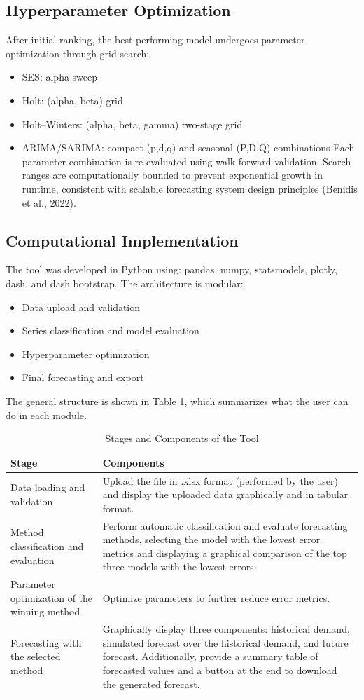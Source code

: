 \documentclass[journal,article,submit,pdftex,moreauthors]{Definitions/mdpi}
\begin{document}
\subsection {Hyperparameter Optimization}
After initial ranking, the best-performing model undergoes parameter optimization through grid search:
\begin{itemize}
\item SES: alpha sweep
\item Holt: (alpha, beta) grid
\item Holt–Winters: (alpha, beta, gamma) two-stage grid
\item ARIMA/SARIMA: compact (p,d,q) and seasonal (P,D,Q) combinations
Each parameter combination is re-evaluated using walk-forward validation.
Search ranges are computationally bounded to prevent exponential growth in runtime, consistent with scalable forecasting system design principles (Benidis et al., 2022).
\end{itemize}

\subsection {Computational Implementation}

The tool was developed in Python using: pandas, numpy, statsmodels, plotly, dash, and dash bootstrap.
The architecture is modular:
\begin{itemize}
\item Data upload and validation
\item Series classification and model evaluation
\item Hyperparameter optimization
\item Final forecasting and export
\end{itemize}

The general structure is shown in Table 1, which summarizes what the user can do in each module.
\begin{table}[H]
\caption{Stages and Components of the Tool}
\centering
\begin{tabularx}{\textwidth}{lX}
\toprule
\textbf{Stage} & \textbf{Components} \\
\midrule
Data loading and validation & Upload the file in .xlsx format (performed by the user) and display the uploaded data graphically and in tabular format. \\
Method classification and evaluation & Perform automatic classification and evaluate forecasting methods, selecting the model with the lowest error metrics and displaying a graphical comparison of the top three models with the lowest errors. \\
Parameter optimization of the winning method & Optimize parameters to further reduce error metrics. \\
Forecasting with the selected method & Graphically display three components: historical demand, simulated forecast over the historical demand, and future forecast. Additionally, provide a summary table of forecasted values and a button at the end to download the generated forecast. \\
\bottomrule
\end{tabularx}
\end{table}
\end{document}
